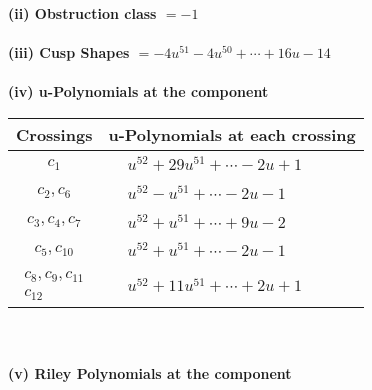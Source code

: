 \documentclass[1p]{elsarticle_modified}
\theoremstyle{definition}
\begin{document}
\flushleft \textbf{(ii) Obstruction class $= -1$}\\~\\
\flushleft \textbf{(iii) Cusp Shapes $= -4 u^{51}-4 u^{50}+\cdots+16 u-14$}\\~\\
\newpage\renewcommand{\arraystretch}{1}
\flushleft \textbf{(iv) u-Polynomials at the component}\newline \\
\begin{tabular}{m{50pt}|m{274pt}}
Crossings & \hspace{64pt}u-Polynomials at each crossing \\
\hline $$\begin{aligned}c_{1}\end{aligned}$$&$\begin{aligned}
&u^{52}+29 u^{51}+\cdots-2 u+1
\end{aligned}$\\
\hline $$\begin{aligned}c_{2},c_{6}\end{aligned}$$&$\begin{aligned}
&u^{52}- u^{51}+\cdots-2 u-1
\end{aligned}$\\
\hline $$\begin{aligned}c_{3},c_{4},c_{7}\end{aligned}$$&$\begin{aligned}
&u^{52}+u^{51}+\cdots+9 u-2
\end{aligned}$\\
\hline $$\begin{aligned}c_{5},c_{10}\end{aligned}$$&$\begin{aligned}
&u^{52}+u^{51}+\cdots-2 u-1
\end{aligned}$\\
\hline $$\begin{aligned}c_{8},c_{9},c_{11}\\c_{12}\end{aligned}$$&$\begin{aligned}
&u^{52}+11 u^{51}+\cdots+2 u+1
\end{aligned}$\\
\hline
\end{tabular}\\~\\
\newpage\renewcommand{\arraystretch}{1}
\flushleft \textbf{(v) Riley Polynomials at the component}\newline \\
\end{document}
